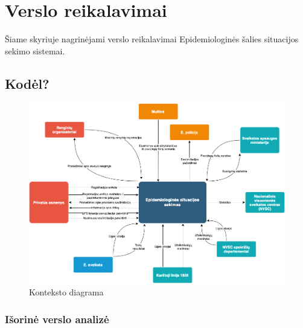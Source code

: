 \documentclass{VUMIFPSkursinis}
\begin{document}
\section{Verslo reikalavimai}\label{sec:versloReq}
Šiame skyriuje nagrinėjami verslo reikalavimai Epidemiologinės šalies situacijos sekimo sistemai.
\subsection{Kodėl?}\label{sec:versloReqWhy}

\begin{figure}[H]
	\centering
	\includegraphics[scale=0.5]{img/context_diagram.png}
	\caption{Konteksto diagrama}
	\label{img:context_diagram}
\end{figure}

\subsubsection{Išorinė verslo analizė}\label{sec:versloReqWhyAnalysis}
\end{document}
